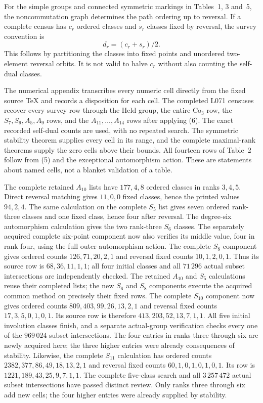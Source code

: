 \documentclass[11pt]{article}
\begin{document}
For the simple groups and connected symmetric markings in Tables~1,
3 and~5, the noncommutation graph determines the path ordering up to
reversal. If a complete census has $c_r$ ordered classes and $s_r$
classes fixed by reversal, the survey convention is
\[
                            d_r=(c_r+s_r)/2.                  \tag{6}
\]
This follows by partitioning the classes into fixed points and
unordered two-element reversal orbits. It is not valid to halve
$c_r$ without also counting the self-dual classes.

The numerical appendix transcribes every numeric cell directly from
the fixed source TeX and records a disposition for each cell. The
completed L071 censuses recover every survey row through the Held
group, the entire $\mathrm{Co}_3$ row, the $S_7,S_9,A_5,A_9$ rows,
and the $A_{11},\ldots,A_{14}$ rows after applying (6). The exact
recorded self-dual counts are used, with no repeated search. The
symmetric stability theorem supplies every cell in its range, and
the complete maximal-rank theorems supply the zero cells above their
bounds. All fourteen rows of Table~2 follow from (5) and the
exceptional automorphism action. These are statements about named
cells, not a blanket validation of a table.

The complete retained $A_{10}$ lists have $177,4,8$ ordered classes
in ranks $3,4,5$. Direct reversal matching gives $11,0,0$ fixed
classes, hence the printed values $94,2,4$. The same calculation
on the complete $S_5$ list gives seven ordered rank-three classes
and one fixed class, hence four after reversal. The degree-six automorphism calculation gives the two rank-three
$S_6$ classes. The separately acquired complete six-point component
now also verifies its middle value, four in rank four, using the full
outer-automorphism action. The complete $S_8$ component gives ordered
counts $126,71,20,2,1$ and reversal fixed counts $10,1,2,0,1$.
Thus its source row is $68,36,11,1,1$; all four initial classes and
all $71\,296$ actual subset intersections are independently checked.
The retained $A_{10}$ and $S_5$ calculations reuse their completed
lists; the new $S_6$ and $S_8$ components execute the acquired common
method on precisely their fixed rows. The complete $S_{10}$ component
now gives ordered counts $809,403,99,26,13,2,1$ and reversal fixed counts
$17,3,5,0,1,0,1$. Its source row is therefore $413,203,52,13,7,1,1$.
All five initial involution classes finish, and a separate actual-group
verification checks every one of the $969\,024$ subset intersections.
The four entries in ranks three through six are newly acquired here;
the three higher entries were already consequences of stability.
Likewise, the complete $S_{11}$ calculation has ordered counts
$2382,377,86,49,18,13,2,1$ and reversal fixed counts
$60,1,0,1,0,1,0,1$. Its row is
$1221,189,43,25,9,7,1,1$. The complete five-class search and all
$3\,257\,472$ actual subset intersections have passed distinct review.
Only ranks three through six add new cells; the four higher entries
were already supplied by stability.
\end{document}
